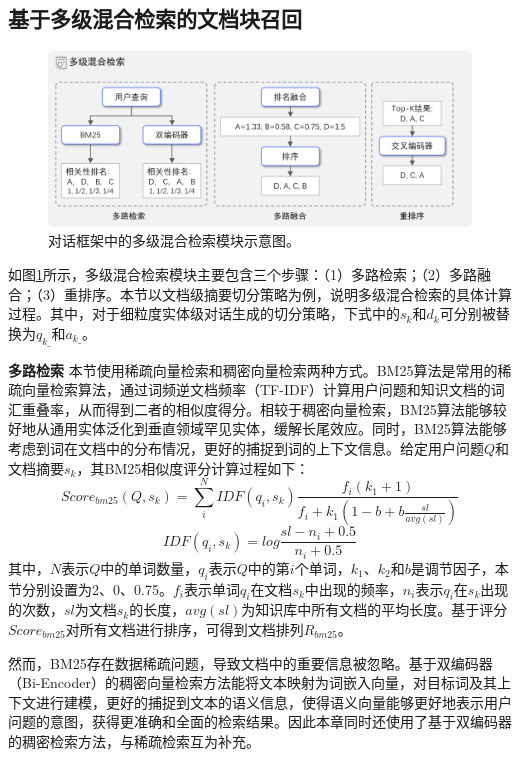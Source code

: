 \subsection{基于多级混合检索的文档块召回}

\begin{figure}[htbp]
	\centering
	\includegraphics[scale=0.55]{Fig/search_module.png}
	\caption{\label{search_module}对话框架中的多级混合检索模块示意图。}
\end{figure}

如图\ref{search_module}所示，多级混合检索模块主要包含三个步骤：（1）多路检索；（2）多路融合；（3）重排序。本节以文档级摘要切分策略为例，说明多级混合检索的具体计算过程。其中，对于细粒度实体级对话生成的切分策略，下式中的$s_k$和$d_k$可分别被替换为$q_{k\_}$和$a_{k\_}$。

\textbf{多路检索} 本节使用稀疏向量检索和稠密向量检索两种方式。BM25算法是常用的稀疏向量检索算法，通过词频逆文档频率（TF-IDF）计算用户问题和知识文档的词汇重叠率，从而得到二者的相似度得分。相较于稠密向量检索，BM25算法能够较好地从通用实体泛化到垂直领域罕见实体，缓解长尾效应。同时，BM25算法能够考虑到词在文档中的分布情况，更好的捕捉到词的上下文信息。给定用户问题$Q$和文档摘要$s_k$，其BM25相似度评分计算过程如下：
\begin{equation}
	Score_{bm25}(Q, s_k) = \sum_{i}^{N}IDF(q_i, s_k)\frac{f_i(k_1+1)}{f_i + k_1(1 - b + b\frac{sl}{avg(sl)})}
\end{equation}
\begin{equation}
	IDF(q_i, s_k) = log\frac{sl-n_i+0.5}{n_i+0.5}
\end{equation}
其中，$N$表示$Q$中的单词数量，$q_i$表示$Q$中的第$i$个单词，$k_1$、$k_2$和$b$是调节因子，本节分别设置为2、0、0.75。$f_i$表示单词$q_i$在文档$s_k$中出现的频率，$n_i$表示$q_i$在$s_k$出现的次数，$sl$为文档$s_k$的长度，$avg(sl)$为知识库中所有文档的平均长度。基于评分$Score_{bm25}$对所有文档进行排序，可得到文档排列$R_{bm25}$。

然而，BM25存在数据稀疏问题，导致文档中的重要信息被忽略。基于双编码器（Bi-Encoder）的稠密向量检索方法能将文本映射为词嵌入向量，对目标词及其上下文进行建模，更好的捕捉到文本的语义信息，使得语义向量能够更好地表示用户问题的意图，获得更准确和全面的检索结果。因此本章同时还使用了基于双编码器的稠密检索方法，与稀疏检索互为补充。

